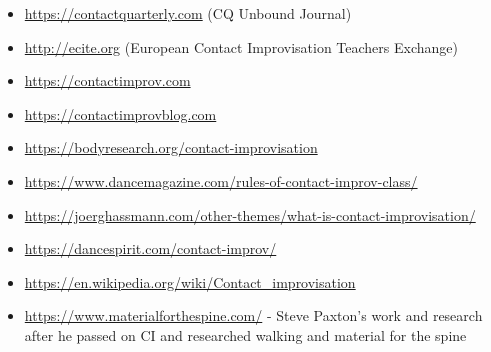 \begin{itemize}
    \setlength\itemsep{0em}
    \item \url{https://contactquarterly.com} (CQ Unbound Journal)
    \item \url{http://ecite.org} (European Contact Improvisation Teachers Exchange)
    \item \url{https://contactimprov.com}
    \item \url{https://contactimprovblog.com}
    \item \url{https://bodyresearch.org/contact-improvisation}
    \item \url{https://www.dancemagazine.com/rules-of-contact-improv-class/}
    \item \url{https://joerghassmann.com/other-themes/what-is-contact-improvisation/}
    \item \url{https://dancespirit.com/contact-improv/}
    \item \url{https://en.wikipedia.org/wiki/Contact_improvisation}
    \item \url{https://www.materialforthespine.com/} - Steve Paxton's work and research after he passed on CI and researched walking and material for the spine
\end{itemize}
